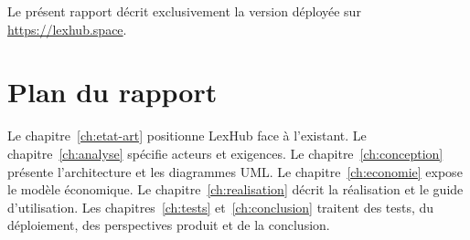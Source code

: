 Le présent rapport décrit exclusivement la version déployée sur \url{https://lexhub.space}.

\section{Plan du rapport}

Le chapitre~\ref{ch:etat-art} positionne LexHub face à l'existant. Le chapitre~\ref{ch:analyse} spécifie acteurs et exigences. Le chapitre~\ref{ch:conception} présente l'architecture et les diagrammes UML. Le chapitre~\ref{ch:economie} expose le modèle économique. Le chapitre~\ref{ch:realisation} décrit la réalisation et le guide d'utilisation. Les chapitres~\ref{ch:tests} et~\ref{ch:conclusion} traitent des tests, du déploiement, des perspectives produit et de la conclusion.

